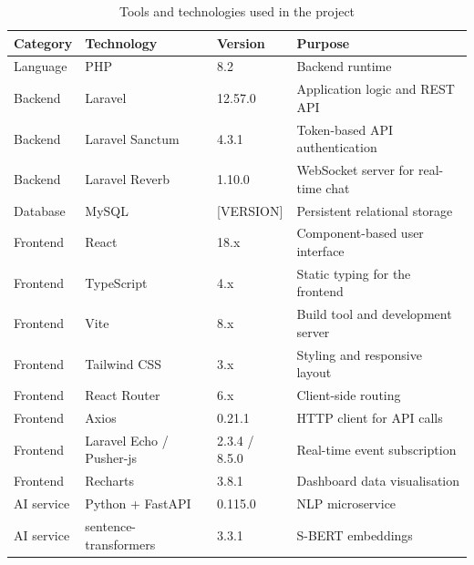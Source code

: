 %
\begin{table}[H]
  \centering
  \caption{Tools and technologies used in the project}
  \label{tab:tools}
  \small
  \begin{tabularx}{\textwidth}{|l|l|l|X|}
    \hline
    \textbf{Category} & \textbf{Technology} & \textbf{Version} &
    \textbf{Purpose} \\
    \hline
    Language & PHP & 8.2 & Backend runtime \\
    \hline
    Backend & Laravel & 12.57.0 & Application logic and REST API \\
    \hline
    Backend & Laravel Sanctum & 4.3.1 & Token-based API authentication \\
    \hline
    Backend & Laravel Reverb & 1.10.0 & WebSocket server for real-time chat \\
    \hline
    Database & MySQL & [VERSION] & Persistent relational storage \\
    \hline
    Frontend & React & 18.x & Component-based user interface \\
    \hline
    Frontend & TypeScript & 4.x & Static typing for the frontend \\
    \hline
    Frontend & Vite & 8.x & Build tool and development server \\
    \hline
    Frontend & Tailwind CSS & 3.x & Styling and responsive layout \\
    \hline
    Frontend & React Router & 6.x & Client-side routing \\
    \hline
    Frontend & Axios & 0.21.1 & HTTP client for API calls \\
    \hline
    Frontend & Laravel Echo / Pusher-js & 2.3.4 / 8.5.0 & Real-time event subscription \\
    \hline
    Frontend & Recharts & 3.8.1 & Dashboard data visualisation \\
    \hline
    AI service & Python + FastAPI & 0.115.0 & NLP microservice \\
    \hline
    AI service & sentence-transformers & 3.3.1 & S-BERT embeddings \\

\end{tabularx}
\end{table}
